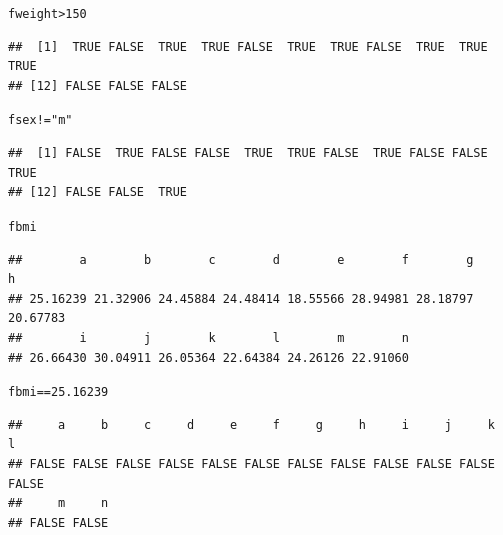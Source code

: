 \documentclass{beamer}\usepackage[]{graphicx}\usepackage[]{color}
\makeatletter
\newcommand{\hlnum}[1]{\textcolor[rgb]{0.686,0.059,0.569}{#1}}%
\newcommand{\hlstr}[1]{\textcolor[rgb]{0.192,0.494,0.8}{#1}}%
\newcommand{\hlopt}[1]{\textcolor[rgb]{0,0,0}{#1}}%
\newcommand{\hlstd}[1]{\textcolor[rgb]{0.345,0.345,0.345}{#1}}%
\newenvironment{kframe}{%
 \def\at@end@of@kframe{}%
 \ifinner\ifhmode%
  \def\at@end@of@kframe{\end{minipage}}%
  \begin{minipage}{\columnwidth}%
 \fi\fi%
 \def\FrameCommand##1{\hskip\@totalleftmargin \hskip-\fboxsep
 \colorbox{shadecolor}{##1}\hskip-\fboxsep
     \hskip-\linewidth \hskip-\@totalleftmargin \hskip\columnwidth}%
 \MakeFramed {\advance\hsize-\width
   \@totalleftmargin\z@ \linewidth\hsize
   \@setminipage}}%
 {\par\unskip\endMakeFramed%
 \at@end@of@kframe}
\newenvironment{knitrout}{}{} %
\renewenvironment{knitrout}{\begin{singlespace}}{\end{singlespace}}
\theoremstyle{mystyle}
\makeatother
\begin{document}
\begin{frame}[fragile]{}
\begin{knitrout}
\color{fgcolor}\begin{kframe}
\begin{alltt}
\hlstd{fweight} \hlopt{>} \hlnum{150}
\end{alltt}
\begin{verbatim}
##  [1]  TRUE FALSE  TRUE  TRUE FALSE  TRUE  TRUE FALSE  TRUE  TRUE  TRUE
## [12] FALSE FALSE FALSE
\end{verbatim}
\begin{alltt}
\hlstd{fsex}\hlopt{!=}\hlstr{"m"}
\end{alltt}
\begin{verbatim}
##  [1] FALSE  TRUE FALSE FALSE  TRUE  TRUE FALSE  TRUE FALSE FALSE  TRUE
## [12] FALSE FALSE  TRUE
\end{verbatim}
\begin{alltt}
\hlstd{fbmi}
\end{alltt}
\begin{verbatim}
##        a        b        c        d        e        f        g        h 
## 25.16239 21.32906 24.45884 24.48414 18.55566 28.94981 28.18797 20.67783 
##        i        j        k        l        m        n 
## 26.66430 30.04911 26.05364 22.64384 24.26126 22.91060
\end{verbatim}
\begin{alltt}
\hlstd{fbmi}\hlopt{==}\hlnum{25.16239}
\end{alltt}
\begin{verbatim}
##     a     b     c     d     e     f     g     h     i     j     k     l 
## FALSE FALSE FALSE FALSE FALSE FALSE FALSE FALSE FALSE FALSE FALSE FALSE 
##     m     n 
## FALSE FALSE
\end{verbatim}
\end{kframe}
\end{knitrout}
\end{frame}
\end{document}
